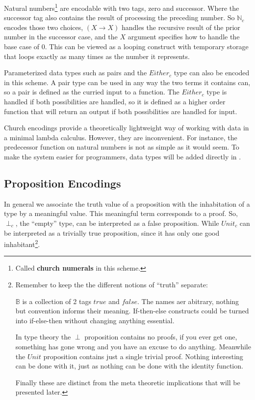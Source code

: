 Natural numbers\footnote{
  Called \textbf{church numerals} in this scheme.
} are encodable with two tags, zero and successor.
Where the successor tag also contains the result of processing the preceding number.
So $\mathbb{N}_{c}$ encodes those two choices, $(X\rightarrow X)$ handles the recursive result of the prior number in the successor case, and the $X$ argument specifies how to handle the base case of $0$.
This can be viewed as a looping construct with temporary storage that loops exactly as many times as the number it represents.

Parameterized data types such as pairs and the $Either_c$ type can also be encoded in this scheme.
A pair type can be used in any way the two terms it contains can, so a pair is defined as the curried input to a function.
The $Either_c$ type is handled if both possibilities are handled, so it is defined as a higher order function that will return an output if both possibilities are handled for input.


Church encodings provide a theoretically lightweight way of working with data in a minimal lambda calculus.
However, they are inconvenient.
For instance, the predecessor function on natural numbers is not as simple as it would seem.
To make the system easier for programmers, data types will be added directly in .

\subsection{Proposition Encodings}


In general we associate the truth value of a proposition with the inhabitation of a type by a meaningful value.
This meaningful term corresponds to a proof.
So, $\perp_{c}$, the ``empty'' type, can be interpreted as a false proposition.
While $Unit_{c}$ can be interpreted as a trivially true proposition, since it has only one good inhabitant\footnote{
  Remember to keep the the different notions of ``truth'' separate:

  $\mathbb{B}$ is a collection of 2 tags $true$ and $false$.
  The names aer abitrary, nothing but convention informs their meaning.
  If-then-else constructs could be turned into if-else-then without changing anything essential.

  In type theory the $\perp$ proposition contains no proofs, if you ever get one, something has gone wrong and you have an excuse to do anything.
  Meanwhile the $Unit$ proposition contains just a single trivial proof.
  Nothing interesting can be done with it, just as nothing can be done with the identity function.
  
  Finally these are distinct from the meta theoretic implications that will be presented later.
}.

